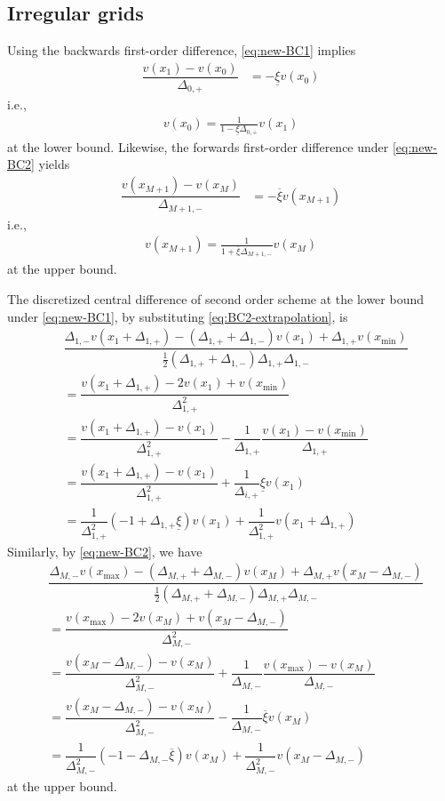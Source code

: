 \documentclass[11pt]{article}
\theoremstyle{definition}
\begin{document}
\subsection{Irregular grids}
Using the backwards first-order difference, \eqref{eq:new-BC1} implies
\begin{align}
\dfrac{v({x_{1}}) - v(x_{0})}{\Delta_{0,+}} &= - \underline{\xi} v({x_{0}})
\end{align}
i.e.,
\begin{align}\label{eq:BC1-extrapolation}
v(x_0) = \frac{1}{1-\underline{\xi} \Delta_{0,+} } v(x_1)
\end{align}
at the lower bound. Likewise, the forwards first-order difference under \eqref{eq:new-BC2} yields
\begin{align}
\dfrac{v(x_{M+1}) - v( {x_{M}})}{\Delta_{M+1,-}} &= - \overline{\xi} v({x_{M+1}})
\end{align}
i.e.,
\begin{align}\label{eq:BC2-extrapolation}
v(x_{M+1}) = \frac{1}{1+\overline{\xi} \Delta_{M+1,-} } v(x_M)
\end{align}
at the upper bound.

The discretized central difference of second order scheme at the lower bound under \eqref{eq:new-BC1}, by substituting \eqref{eq:BC2-extrapolation}, is
\begin{align}
&\dfrac{\Delta_{1,-} v( {x_{1}} + \Delta_{1,+}) - (\Delta_{1,+} + \Delta_{1,-}) v({x_{1}}) + \Delta_{1,+}  v( x_{\min})}{\frac{1}{2}(\Delta_{1,+} + \Delta_{1,-}) \Delta_{1,+} \Delta_{1,-} } \\
&=
\dfrac{v ({x_{1}}+\Delta_{1, +}) - 2 v({x_{1}}) + v(x_{\min})}{\Delta_{1, +}^2} \\
&= \dfrac{v({x_{1}} + \Delta_{1, +}) - v({x_{1}})}{\Delta_{1, +}^2} - \dfrac{1}{\Delta_{1, +}}\dfrac{v({x_{1}}) - v(x_{\min}) }{\Delta_{1, +}}  \\
&= \dfrac{v({x_{1}} + \Delta_{1, +}) - v({x_{1}})}{\Delta_{1, +}^2} + \dfrac{1}{\Delta_{i,+}} \underline{\xi} v({x_{1}})  \\
&= \dfrac{1}{\Delta_{1, +}^2}  (- 1 + \Delta_{1, +} \underline{\xi}) v({x_{1}})  + \dfrac{1}{\Delta_{1, +}^2}  v({x_{1}} + \Delta_{1, +})
\end{align}
Similarly, by \eqref{eq:new-BC2}, we have
\begin{align}
&\dfrac{\Delta_{M,-} v( x_{\max}) - (\Delta_{M,+} + \Delta_{M,-}) v({x_{M}} ) + \Delta_{M,+}  v( {x_{M}} - \Delta_{M,-})}{\frac{1}{2}(\Delta_{M,+} + \Delta_{M,-}) \Delta_{M,+} \Delta_{M,-} } \\
&=\dfrac{v(x_{\max}) - 2 v({x_{M}} ) + v({x_{M}} -\Delta_{M,-})}{\Delta_{M,-}^2} \\
&=   \dfrac{v({x_{M}} - \Delta_{M,-}) - v({x_{M}})}{\Delta_{M,-}^2} + \dfrac{1}{\Delta_{M,-}}\dfrac{ v(x_{\max}) - v ({x_{M}}) }{\Delta_{M,-}}  \\
&= \dfrac{v({x_{M}} - \Delta_{M,-}) - v({x_{M}})}{\Delta_{M,-}^2}  - \dfrac{1}{\Delta_{M,-}} \overline{\xi} v({x_{M}})  \\
&= \dfrac{1}{\Delta_{M,-}^2}  (- 1 - \Delta_{M,-} \overline{\xi}) v({x_{M}})  + \dfrac{1}{\Delta_{M,-}^2}  v({x_{M}} - \Delta_{M,-})
\end{align}
at the upper bound.
\end{document}
